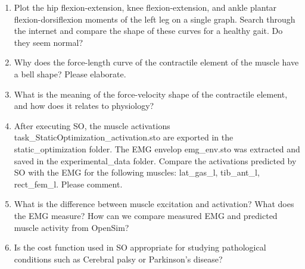 \documentclass[11pt]{article}
\begin{document}
\begin{enumerate}
    \item Plot the hip flexion-extension, knee flexion-extension, and ankle plantar flexion-dorsiflexion moments of the left leg on a single graph. Search through the internet and compare the shape of these curves for a healthy gait. Do they seem normal?
    \item Why does the force-length curve of the contractile element of the muscle have a bell shape? Please elaborate. 
    \item What is the meaning of the force-velocity shape of the contractile element, and how does it relates to physiology? 
    \item After executing SO, the muscle activations task\_StaticOptimization\_activation.sto are exported in the static\_optimization folder. The EMG envelop emg\_env.sto was extracted and saved in the experimental\_data folder. Compare the activations predicted by SO with the EMG for the following muscles: lat\_gas\_l, tib\_ant\_l, rect\_fem\_l. Please comment.
    \item What is the difference between muscle excitation and activation? What does the EMG measure? How can we compare measured EMG and predicted muscle activity from OpenSim?
    \item Is the cost function used in SO appropriate for studying pathological conditions such as Cerebral palsy or Parkinson’s disease?
\end{enumerate}
\end{document}
